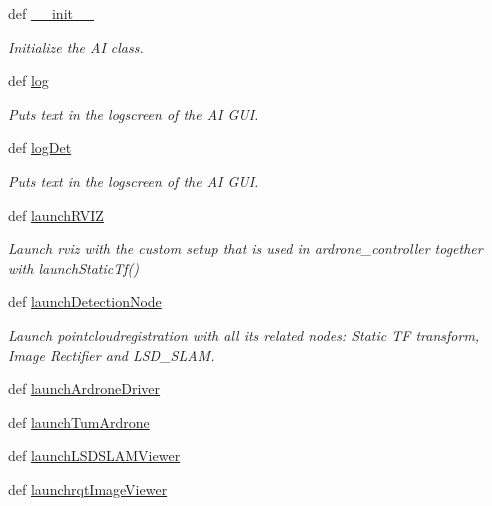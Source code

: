 \begin{DoxyCompactItemize}
\item 
def \hyperlink{classstaircaseai_1_1staircaseAI_a959826fb3658b9e4080fdad1af3db9e0}{\-\_\-\-\_\-init\-\_\-\-\_\-}
\begin{DoxyCompactList}\small\item\em Initialize the A\-I class. \end{DoxyCompactList}\item 
def \hyperlink{classstaircaseai_1_1staircaseAI_a4ff981aeb976bec76974ff49782cc84b}{log}
\begin{DoxyCompactList}\small\item\em Puts text in the logscreen of the A\-I G\-U\-I. \end{DoxyCompactList}\item 
def \hyperlink{classstaircaseai_1_1staircaseAI_a53c80e974fec7df7ce206eeff7e44d26}{log\-Det}
\begin{DoxyCompactList}\small\item\em Puts text in the logscreen of the A\-I G\-U\-I. \end{DoxyCompactList}\item 
def \hyperlink{classstaircaseai_1_1staircaseAI_a7170e090765a0c5664664108e3f38ea1}{launch\-R\-V\-I\-Z}
\begin{DoxyCompactList}\small\item\em Launch rviz with the custom setup that is used in ardrone\-\_\-controller together with launch\-Static\-Tf() \end{DoxyCompactList}\item 
def \hyperlink{classstaircaseai_1_1staircaseAI_a0b234cbac093233518729fa5ea0ad725}{launch\-Detection\-Node}
\begin{DoxyCompactList}\small\item\em Launch pointcloudregistration with all its related nodes\-: Static T\-F transform, Image Rectifier and L\-S\-D\-\_\-\-S\-L\-A\-M. \end{DoxyCompactList}\item 
def \hyperlink{classstaircaseai_1_1staircaseAI_a5274e2c215ae921ba6f299639215588b}{launch\-Ardrone\-Driver}
\item 
def \hyperlink{classstaircaseai_1_1staircaseAI_ad6c9232a0f6421ddbedf68b45bda1fe6}{launch\-Tum\-Ardrone}
\item 
def \hyperlink{classstaircaseai_1_1staircaseAI_acef3807e16c5df0f1d4723c33785f72e}{launch\-L\-S\-D\-S\-L\-A\-M\-Viewer}
\item 
def \hyperlink{classstaircaseai_1_1staircaseAI_a72d9ae05f9b3a8ac4b937e284164d5c5}{launchrqt\-Image\-Viewer}

\end{DoxyCompactItemize}
